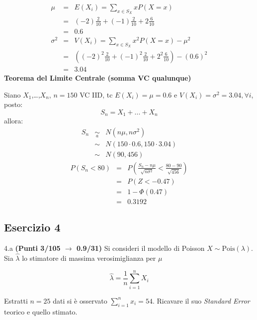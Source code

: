 \documentclass[
  11pt,
]{book}
\theoremstyle{mytheoremstyle}
\theoremstyle{mydefstyle}
\newenvironment{sol}
  {
  \begin{tcolorbox}[enhanced,breakable,arc=0.1mm,boxrule=1pt,colback=white,colframe=iblue,
  title=\bf \fontfamily{lmss}\selectfont \hspace{.5 cm} Soluzione,drop fuzzy shadow]

}{
\end{tcolorbox}
  }
\begin{document}
\begin{sol}
\begin{eqnarray*} \mu &=& E(X_i) = \sum_{x\in S_X}x P(X=x)\\ 
 &=& ( -2 ) \frac { 2 }{ 10 }+( -1 ) \frac { 2 }{ 10 }+ 2  \frac { 6 }{ 10 } \\ 
            &=& 0.6 \\ 
 \sigma^2 &=& V(X_i) = \sum_{x\in S_X}x^2 P(X=x)-\mu^2\\ 
 &=&\left( ( -2 ) ^2\frac { 2 }{ 10 }+( -1 ) ^2\frac { 2 }{ 10 }+ 2  ^2\frac { 6 }{ 10 } \right)-( 0.6 )^2\\ 
            &=& 3.04 
\end{eqnarray*}
\textbf{Teorema del Limite Centrale (somma VC qualunque)}

Siano \(X_1\),\ldots,\(X_n\), \(n=150\) VC IID, tc \(E(X_i)=\mu=0.6\) e \(V(X_i)=\sigma^2=3.04,\forall i\), posto:
\[
      S_n = X_1 + ... + X_n
      \]
allora:\begin{eqnarray*}
  S_n & \mathop{\sim}\limits_{a}& N(n\mu,n\sigma^2) \\
     &\sim & N(150\cdot0.6,150\cdot3.04) \\
     &\sim & N(90,456) 
  \end{eqnarray*}\begin{eqnarray*}
      P( S_n   <   80 ) 
        &=& P\left(  \frac { S_n  -  n\mu }{ \sqrt{n\sigma^2} }  <  \frac { 80  -  90 }{\sqrt{ 456 }} \right)  \\
                 &=& P\left(  Z   <   -0.47 \right) \\    
                 &=&  1-\Phi( 0.47 ) \\ &=&  0.3192 
      \end{eqnarray*}

\end{sol}

\subsection{Esercizio 4}\label{esercizio-4-41}

4.a \textbf{(Punti 3/105 \(\rightarrow\) 0.9/31)} Si consideri il modello di Poisson \(X\sim\text{Pois}(\lambda)\). Sia \(\hat\lambda\) lo stimatore di massima verosimiglianza per \(\mu\)

\[
  \hat\lambda = \frac 1n \sum_{i=1}^n X_i
\]

Estratti \(n=25\) dati si è osservato \(\sum_{i=1}^nx_i=54\). Ricavare il suo \emph{Standard Error} teorico e quello stimato.
\end{document}
